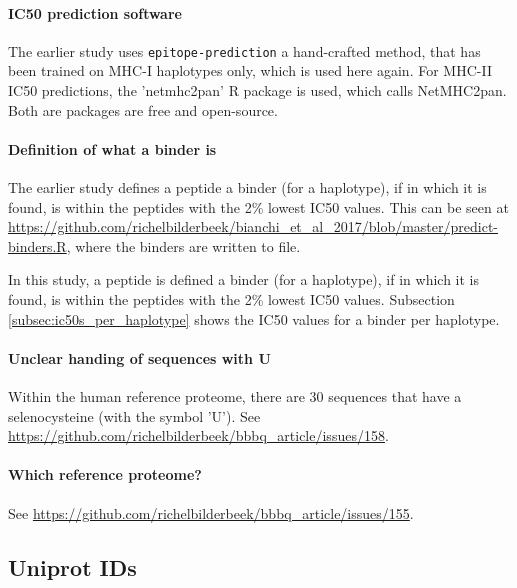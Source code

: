 \paragraph{IC50 prediction software}

The earlier study uses \verb;epitope-prediction; a hand-crafted method, 
that has been trained on MHC-I haplotypes only,
which is used here again. For MHC-II IC50 predictions, the
'netmhc2pan' R package is used, which calls NetMHC2pan.
Both are packages are free and open-source.

\paragraph{Definition of what a binder is}

The earlier study defines a peptide a binder (for a haplotype), 
if  in which it is found, 
is within the peptides with the 2\% lowest IC50 values.
This can be seen at \url{https://github.com/richelbilderbeek/bianchi_et_al_2017/blob/master/predict-binders.R},
where the binders are written to file.

In this study, a peptide is defined a binder (for a haplotype), 
if  in which it is found, 
is within the peptides with the 2\% lowest IC50 values.
Subsection \ref{subsec:ic50s_per_haplotype} shows the IC50 values
for a binder per haplotype.

\paragraph{Unclear handing of sequences with U}

Within the human reference proteome, there are 30 sequences that have a
selenocysteine (with the symbol 'U').
See \url{https://github.com/richelbilderbeek/bbbq_article/issues/158}.

\paragraph{Which reference proteome?}

See \url{https://github.com/richelbilderbeek/bbbq_article/issues/155}.


\subsection{Uniprot IDs}


